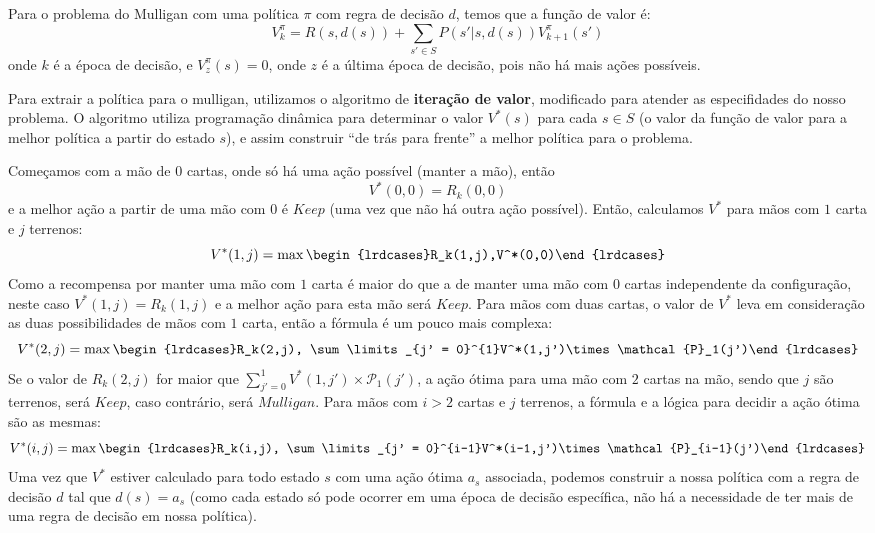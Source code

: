 Para o problema do Mulligan com uma política $\pi$ com regra de decisão $d$, temos que a
função de valor é:
\begin{equation}
  \label{eq:valuefunc}
  V^\pi_k = R(s, d(s)) + \sum \limits_{s' \in S}P(s'|s, d(s))V^\pi_{k+1}(s')
\end{equation}
onde $k$ é a época de decisão, e $V^\pi_z(s) = 0$, onde $z$ é a última época de decisão, pois
não há mais ações possíveis.

Para extrair a política para o mulligan, utilizamos o algoritmo de \textbf{iteração de valor},
modificado para atender as especifidades do nosso problema. O algoritmo utiliza programação
dinâmica para determinar o valor $V^*(s)$ para cada $s \in S$ (o valor da função de valor para
a melhor política a partir do estado $s$), e assim construir ``de trás para frente'' a melhor
política para o problema.

Começamos com a mão de $0$ cartas, onde só há uma ação possível (manter a mão), então
\begin{equation*}
  V^*(0,0)=R_k(0,0)
\end{equation*}
e a melhor ação a partir de uma mão com $0$ é $Keep$ (uma vez que não há
outra ação possível). Então, calculamos $V^*$ para mãos com $1$ carta e $j$ terrenos:
\begin{equation*}
  V^*(1,j) = \max\begin{lrdcases}R_k(1,j),V^*(0,0)\end{lrdcases}
\end{equation*}
Como a recompensa por manter uma mão com $1$ carta é maior do que a de manter uma mão com
$0$ cartas independente da configuração, neste caso $V^*(1,j)=R_k(1,j)$ e a melhor ação para
esta mão será $Keep$. Para mãos com duas cartas, o valor de $V^*$ leva em consideração as duas
possibilidades de mãos com $1$ carta, então a fórmula é um pouco mais complexa:
\begin{equation*}
  V^*(2,j) =  \max\begin{lrdcases}R_k(2,j),
              \sum\limits_{j' = 0}^{1}V^*(1,j')\times\mathcal{P}_1(j')\end{lrdcases}
\end{equation*}
Se o valor de $R_k(2,j)$ for maior que $\sum\limits_{j' = 0}^{1}V^*(1,j')\times\mathcal{P}_1(j')$,
a ação ótima para uma mão com $2$ cartas na mão, sendo que $j$ são terrenos, será $Keep$, caso
contrário, será $Mulligan$. Para mãos com $i>2$ cartas e $j$ terrenos, a fórmula e a lógica para
decidir a ação ótima são as mesmas:
\begin{equation*}
  V^*(i,j) =  \max\begin{lrdcases}R_k(i,j),
              \sum\limits_{j' = 0}^{i-1}V^*(i-1,j')\times\mathcal{P}_{i-1}(j')\end{lrdcases}
\end{equation*}
Uma vez que $V^*$ estiver calculado para todo estado $s$ com uma ação ótima $a_s$ associada,
podemos construir a nossa política com a regra de decisão $d$ tal que $d(s) = a_s$ (como cada
estado só pode ocorrer em uma época de decisão específica, não há a necessidade de ter mais
de uma regra de decisão em nossa política).

